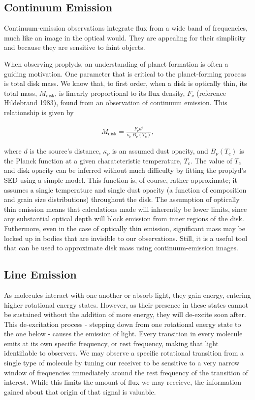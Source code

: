 \subsection{Continuum Emission}

Continuum-emission observations integrate flux from a wide band of frequencies, much like an image in the optical would. They are appealing for their simplicity and because they are sensitive to faint objects.

When observing proplyds, an understanding of planet formation is often a guiding motivation. One parameter that is critical to the planet-forming process is total disk mass. We know that, to first order, when a disk is optically thin, its total mass, $M_{\text{disk}}$, is linearly proportional to its flux density, $F_{\nu}$ (reference Hildebrand 1983), found from an observation of continuum emission. This relationship is given by

\begin{align}
M_{\text{disk}} = \frac{F_{\nu} d^2}{\kappa_{\nu}\ B_{\nu}(T_c)},
\end{align}

where $d$ is the source's distance, $\kappa_{\nu}$ is an assumed dust opacity, and $B_{\nu}(T_c)$ is the Planck function at a given charatcteristic temperature, $T_c$. The value of $T_c$ and disk opacity can be inferred without much difficulty by fitting the proplyd's SED using a simple model. This function is, of course, rather approximate; it assumes a single temperature and single dust opacity (a function of composition and grain size distributions) throughout the disk. The assumption of optically thin emission means that calculations made will inherently be lower limits, since any substantial optical depth will block emission from inner regions of the disk. Futhermore, even in the case of optically thin emission, significant mass may be locked up in bodies that are invisible to our observations. Still, it is a useful tool that can be used to approximate disk mass using continuum-emission images.


\subsection{Line Emission}

As molecules interact with one another or absorb light, they gain energy, entering higher rotational energy states. However, as their presence in these states cannot be sustained without the addition of more energy, they will de-excite soon after. This de-excitation process - stepping down from one rotational energy state to the one below - causes the emission of light. Every transition in every molecule emits at its own specific frequency, or rest frequency, making that light identifiable to observers. We may observe a specific rotational transition from a single type of molecule by tuning our receiver to be sensitive to a very narrow window of frequencies immediately around the rest frequency of the transition of interest. While this limits the amount of flux we may receieve, the information gained about that origin of that signal is valuable.

